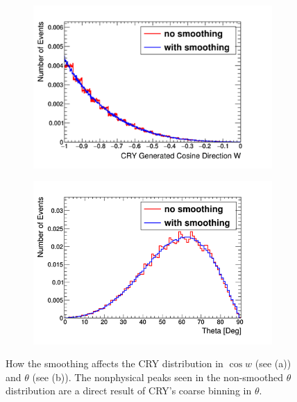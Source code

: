 \begin{figure}[!h]
\centering
\begin{subfigure}{.5\textwidth}
  \centering
  \includegraphics[width=\linewidth]{Chapter4/Figs/Raster/CryPlots/CrySmoothingCosine.png}
  \captionsetup{width=.9\linewidth}
  \caption{}
  \label{subFig:CrySmoothingCosine}
\end{subfigure}%
\begin{subfigure}{.5\textwidth}
  \centering
  \includegraphics[width=\linewidth]{Chapter4/Figs/Raster/CryPlots/CrySmoothingTheta.png}
  \captionsetup{width=.9\linewidth}
  \caption{}
  \label{subFig:CrySmoothingTheta}
\end{subfigure}
\caption{How the smoothing affects the CRY distribution in $\cos{w}$ (see (a)) and $\theta$ (see (b)). The nonphysical peaks seen in the non-smoothed $\theta$ distribution are a direct result of CRY's coarse binning in $\theta$.}
\label{fig:CrySmoothingCosTheta}
\end{figure}

